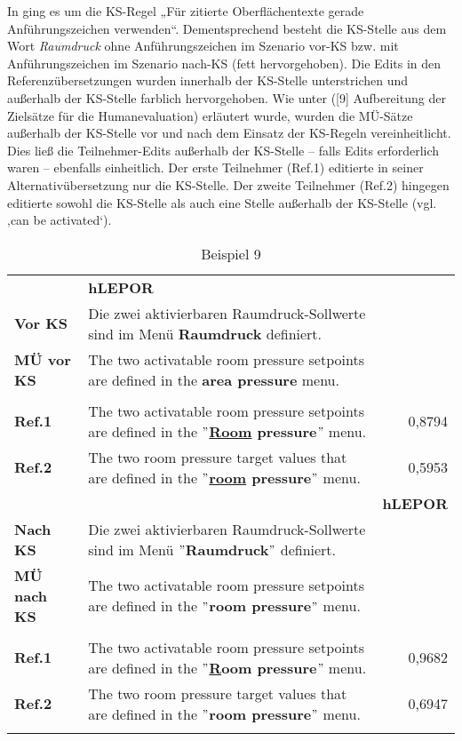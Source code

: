 In  ging es um die KS-Regel „Für zitierte Oberflächentexte gerade Anführungszeichen verwenden“. Dementsprechend besteht die KS-Stelle aus dem Wort \textit{Raumdruck} ohne Anführungszeichen im Szenario vor-KS bzw. mit Anführungszeichen im Szenario nach-KS (fett hervorgehoben). Die Edits in den Referenzübersetzungen wurden innerhalb der KS-Stelle unterstrichen und außerhalb der KS-Stelle farblich hervorgehoben. Wie unter  ([9] Aufbereitung der Zielsätze für die Humanevaluation) erläutert wurde, wurden die MÜ-Sätze außerhalb der KS-Stelle vor und nach dem Einsatz der KS-Regeln vereinheitlicht. Dies ließ die Teilnehmer-Edits außerhalb der KS-Stelle -- falls Edits erforderlich waren -- ebenfalls einheitlich. Der erste Teilnehmer (Ref.1) editierte in seiner Alternativübersetzung nur die KS-Stelle. Der zweite Teilnehmer (Ref.2) hingegen editierte sowohl die KS-Stelle als auch eine Stelle außerhalb der KS-Stelle (vgl. ‚can be activated‘).


\begin{table}
\begin{tabularx}{\textwidth}{lQr}
\lsptoprule
{} & \textbf{hLEPOR}\\
\textbf{Vor KS} & Die zwei aktivierbaren Raumdruck-Sollwerte sind im Menü \textbf{Raumdruck} definiert. & \\
\textbf{MÜ vor KS} & The two activatable room pressure setpoints are defined in the \textbf{area pressure} menu. & \\
{} & {} & \\
\textbf{Ref.1} & The two activatable room pressure setpoints are defined in the \textbf{\ul{$"$Room} pressure\ul{$"$}} menu. & 0,8794\\
\textbf{Ref.2} & The two room pressure target values that  are defined in the \textbf{\ul{$"$room} pressure\ul{$"$}} menu. & 0,5953\\
\midrule
{} & \textbf{hLEPOR}\\
\textbf{Nach KS} & Die zwei aktivierbaren Raumdruck-Sollwerte sind im Menü \textbf{$"$Raumdruck$"$} definiert. & \\
\textbf{MÜ nach KS} & The two activatable room pressure setpoints are defined in the \textbf{$"$room pressure$"$} menu. & \\
{} & {} & \\
\textbf{Ref.1} & The two activatable room pressure setpoints are defined in the \textbf{$"$\ul{R}oom pressure$"$} menu. & 0,9682\\
\textbf{Ref.2} & The two room pressure target values that  are defined in the \textbf{$"$room pressure$"$} menu. & 0,6947\\
\lspbottomrule
\end{tabularx}
\caption{\label{tabex:4:9} Beispiel 9}
\end{table}


